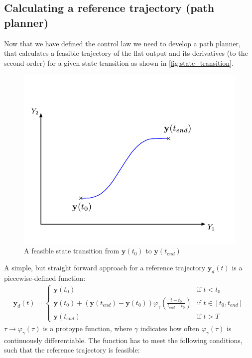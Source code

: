 \documentclass[a4paper,11pt,headings=standardclasses]{scrartcl}%
\begin{document}
\subsection{Calculating a reference trajectory (path planner)}
Now that we have defined the control law we need to develop a path planner, that calculates a feasible trajectory of the flat output and its derivatives (to the second order) for a given state transition as shown in \autoref{fig:state_transition}.
\begin{figure}[ht]
	\centering
	\includegraphics[scale=1]{img/state_transition.pdf}
	\caption{A feasible state transition from $\mathbf{y}(t_0)$ to $\mathbf{y}(t_{end})$}
	\label{fig:state_transition}
\end{figure}
A simple, but straight forward approach for a reference trajectory $\mathbf{y}_d(t)$ is a piecewise-defined function:
\begin{align}
\label{eq:14}
\mathbf{y}_d(t) = \begin{cases} \mathbf{y}(t_0) &\textrm{if } t<t_0 \\ \mathbf{y}(t_0) + (\mathbf{y}(t_{end})-\mathbf{y}(t_0))\varphi_\gamma\left(\frac{t-t_0}{t_{end}-t_0}\right) &\textrm{if } t \in [t_0, t_{end}] \\ \mathbf{y}(t_{end}) &\textrm{if } t>T\end{cases}
\end{align}
$\tau \rightarrow \varphi_\gamma(\tau)$ is a protoype function, where $\gamma$ indicates how often $\varphi_\gamma(\tau)$ is continuously differentiable. The function has to meet the following conditions, such that the reference trajectory is feasible:
\end{document}
